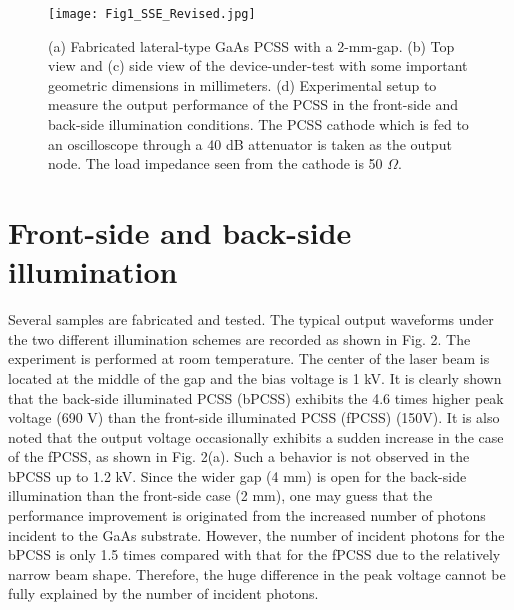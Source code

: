 \documentclass[final,5p,times,twocolumn]{elsarticle}
\newcommand{\revision}[1]{{#1}}
\begin{document}
\begin{figure}[!t]
\centering
\texttt{[image: Fig1\_SSE\_Revised.jpg]}
\caption{
\revision{
(a) Fabricated lateral-type GaAs PCSS with a 2-mm-gap.
(b) Top view and
(c) side view of the device-under-test with some important geometric dimensions in millimeters.
(d) Experimental setup to measure the output performance of the PCSS in the front-side and back-side illumination conditions.
The PCSS cathode which is fed to an oscilloscope through a 40 dB attenuator is taken as the output node. The load impedance seen from the cathode is 50 $\Omega$.
}
}
\label{fig_str}
\end{figure}    


\section{Front-side and back-side illumination}

   Several samples are fabricated and tested.
   The typical output waveforms under the two different illumination schemes are recorded as shown in Fig. 2.
   The experiment is performed at room temperature.
   The center of the laser beam is located at the middle of the gap and the bias voltage is 1 kV.
   It is clearly shown that the back-side illuminated PCSS (bPCSS) exhibits the 4.6 times higher peak voltage (690 V) than the front-side illuminated PCSS (fPCSS) (150V).
   It is also noted that the output voltage occasionally exhibits a sudden increase in the case of the fPCSS, as shown in Fig. 2(a).
   Such a behavior is not observed in the bPCSS up to 1.2 kV.   
   Since the wider gap (4 mm) is open for the back-side illumination than the front-side case (2 mm), one may guess that the performance improvement is originated from the increased number of photons incident to the GaAs substrate.
    However, the number of incident photons for the bPCSS is only 1.5 times compared with that for the fPCSS due to the relatively narrow beam shape.
   Therefore, the huge difference in the peak voltage cannot be fully explained by the number of incident photons. 
\end{document}
